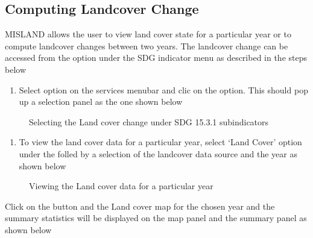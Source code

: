 \documentclass[letterpaper,10pt,english]{sphinxmanual}
\let\sphinxpxdimen\pdfpxdimen\else\newdimen\sphinxpxdimen
\begin{document}
\subsection{Computing Landcover Change}
\label{\detokenize{Service/Calculate_SDG:computing-landcover-change}}
\sphinxAtStartPar
MISLAND allows the user to view land cover state for a particular year or to compute landcover changes between two years. The landcover change
can be accessed from the  option under the SDG indicator menu as described in the steps below
\begin{enumerate}
%
\item {} 
\sphinxAtStartPar
Select  option on the services menu\sphinxhyphen{}bar and clic on the  option. This should pop up a selection panel as the one shown below

\end{enumerate}

\begin{figure}[H]
\centering
\capstart

\noindent\sphinxincludegraphics[width=682\sphinxpxdimen,height=482\sphinxpxdimen]{{lulc1}.png}
\caption{Selecting the Land cover change under SDG 15.3.1 sub\sphinxhyphen{}indicators}\label{\detokenize{Service/Calculate_SDG:id5}}\end{figure}
\begin{enumerate}
%
\setcounter{enumi}{1}
\item {} 
\sphinxAtStartPar
To view the land cover data for a particular year, select ‘Land Cover’ option under the  folled by a selection of the landcover data source and the year as shown below

\end{enumerate}

\begin{figure}[H]
\centering
\capstart

\noindent\sphinxincludegraphics[width=695\sphinxpxdimen,height=482\sphinxpxdimen]{{lulc2}.png}
\caption{Viewing the Land cover data for a particular year}\label{\detokenize{Service/Calculate_SDG:id6}}\end{figure}

\sphinxAtStartPar
Click on the  button and the Land cover map for the chosen year and the summary statistics will be displayed on the map panel and the summary panel as shown below
\end{document}
